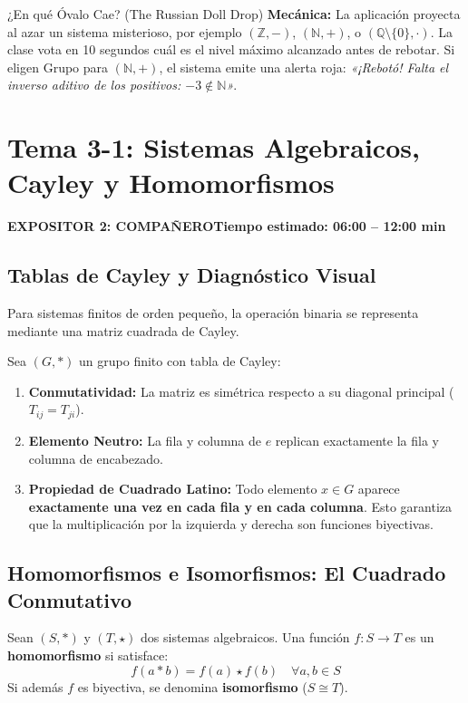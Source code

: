\documentclass[11pt,a4paper]{article}
\newcommand{\badgeComp}{\colorbox{exp2bg}{\textcolor{exp2fg}{\bfseries\sffamily\footnotesize EXPOSITOR 2: COMPAÑERO}}}
\begin{document}
\begin{minijuego}{¿En qué Óvalo Cae? (The Russian Doll Drop)}
\textbf{Mecánica:} La aplicación proyecta al azar un sistema misterioso, por ejemplo $(\mathbb{Z}, -)$, $(\mathbb{N}, +)$, o $(\mathbb{Q} \setminus \{0\}, \cdot)$. La clase vota en 10 segundos cuál es el nivel máximo alcanzado antes de rebotar. Si eligen Grupo para $(\mathbb{N}, +)$, el sistema emite una alerta roja: \textit{«¡Rebotó! Falta el inverso aditivo de los positivos: $-3 \notin \mathbb{N}$»}.
\end{minijuego}

\newpage

\section{Tema 3-1: Sistemas Algebraicos, Cayley y Homomorfismos}
\noindent\badgeComp \hfill \textbf{Tiempo estimado: 06:00 -- 12:00 min}

\subsection{Tablas de Cayley y Diagnóstico Visual}
Para sistemas finitos de orden pequeño, la operación binaria se representa mediante una matriz cuadrada de Cayley.

\begin{teorema}
Sea $(G, *)$ un grupo finito con tabla de Cayley:
\begin{enumerate}[noitemsep]
  \item \textbf{Conmutatividad:} La matriz es simétrica respecto a su diagonal principal ($T_{ij} = T_{ji}$).
  \item \textbf{Elemento Neutro:} La fila y columna de $e$ replican exactamente la fila y columna de encabezado.
  \item \textbf{Propiedad de Cuadrado Latino:} Todo elemento $x \in G$ aparece \textbf{exactamente una vez en cada fila y en cada columna}. Esto garantiza que la multiplicación por la izquierda y derecha son funciones biyectivas.
\end{enumerate}
\end{teorema}

\subsection{Homomorfismos e Isomorfismos: El Cuadrado Conmutativo}
\begin{definicion}
Sean $(S, *)$ y $(T, \star)$ dos sistemas algebraicos. Una función $f: S \to T$ es un \textbf{homomorfismo} si satisface:
\begin{equation}
  f(a * b) = f(a) \star f(b) \quad \forall a, b \in S
\end{equation}
Si además $f$ es biyectiva, se denomina \textbf{isomorfismo} ($S \cong T$).
\end{definicion}
\end{document}
